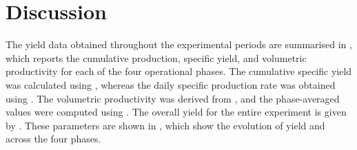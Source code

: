 \chapter{Discussion}
\label{ch:discussion}

The  yield data obtained throughout the experimental periods are summarised in , which reports the cumulative  production, specific yield, and volumetric productivity for each of the four operational phases. The cumulative specific  yield was calculated using , whereas the daily specific  production rate was obtained using . The volumetric productivity was derived from , and the phase-averaged values were computed using . The overall yield for the entire experiment is given by . These parameters are shown in , which show the evolution of  yield and  across the four phases.

